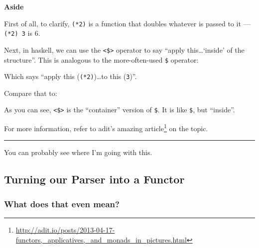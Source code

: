 \documentclass[]{article}
\newenvironment{Shaded}{}{}
\newcommand{\DataTypeTok}[1]{\textcolor[rgb]{0.56,0.13,0.00}{{#1}}}
\newcommand{\DecValTok}[1]{\textcolor[rgb]{0.25,0.63,0.44}{{#1}}}
\newcommand{\FunctionTok}[1]{\textcolor[rgb]{0.02,0.16,0.49}{{#1}}}
\newcommand{\NormalTok}[1]{{#1}}
\renewcommand{\href}[2]{#2\footnote{\url{#1}}}
\begin{document}
\textbf{Aside}

First of all, to clarify, \texttt{(*2)} is a function that doubles whatever is
passed to it --- \texttt{(*2)\ 3} is 6.

Next, in haskell, we can use the \texttt{\textless{}\$\textgreater{}} operator
to say ``apply this\ldots{}`inside' of the structure''. This is analogous to the
more-often-used \texttt{\$} operator:

\begin{Shaded}
\end{Shaded}

Which says ``apply this (\texttt{(*2)})\ldots{}to this (\texttt{3})''.

Compare that to:

\begin{Shaded}
\end{Shaded}

As you can see, \texttt{\textless{}\$\textgreater{}} is the ``container''
version of \texttt{\$}. It is like \texttt{\$}, but ``inside''.

For more information, refer to adit's
\href{http://adit.io/posts/2013-04-17-functors,_applicatives,_and_monads_in_pictures.html}{amazing
article} on the topic.

\begin{center}\rule{0.5\linewidth}{\linethickness}\end{center}

You can probably see where I'm going with this.

\subsection{Turning our Parser into a
Functor}\label{turning-our-parser-into-a-functor}

\subsubsection{What does that even mean?}\label{what-does-that-even-mean}
\end{document}
